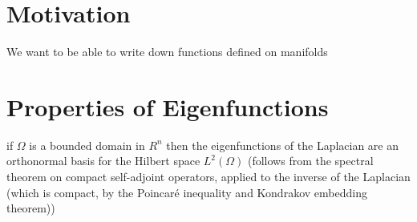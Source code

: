 \section{Motivation}
We want to be able to write down functions defined on manifolds

\section{Properties of Eigenfunctions}
if $\Omega$ is a bounded domain in $R^n$ then the eigenfunctions of the Laplacian are an orthonormal basis for the Hilbert space $L^2(\Omega)$ (follows from the spectral theorem on compact self-adjoint operators, applied to the inverse of the Laplacian (which is compact, by the Poincaré inequality and Kondrakov embedding theorem))